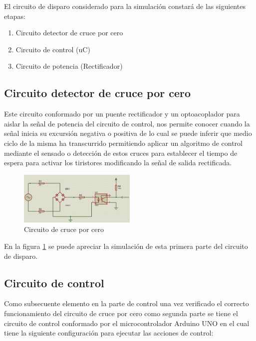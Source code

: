 \documentclass[conference]{IEEEtran}
\begin{document}
	El circuito de disparo considerado para la simulación constará de las siguientes etapas:
	
	\begin{enumerate}
		\item Circuito detector de cruce por cero
		\item Circuito de control (uC)
		\item Circuito de potencia (Rectificador)
	\end{enumerate}
	
	\subsection{\textbf{Circuito detector de cruce por cero}}
	Este circuito conformado por un puente rectificador y un optoacoplador para aislar la señal de potencia del circuito de control, nos permite conocer cuando la señal inicia su excursión negativa o positiva de lo cual se puede inferir que medio ciclo de la misma ha transcurrido permitiendo aplicar un algoritmo de control mediante el sensado o detección de estos cruces para establecer el tiempo de espera para activar los tiristores modificando la señal de salida rectificada.
	
	\begin{figure}[h]
		\centering
		\includegraphics[width=0.5\textwidth]{media/circuito-cruce-cero}
		\caption{Circuito de cruce por cero}
		\label{fig:circuito-cruce-cero}
	\end{figure}
	
	
	En la figura \ref{fig:circuito-cruce-cero} se puede apreciar la simulación de esta primera parte del circuito de disparo.
	
	\subsection{\textbf{Circuito de control}}
	Como subsecuente elemento en la parte de control una vez verificado el correcto funcionamiento del circuito de cruce por cero como segunda parte se tiene el circuito de control conformado por el microcontrolador Arduino UNO en el cual tiene la siguiente configuración para ejecutar las acciones de control:
	
\end{document}
